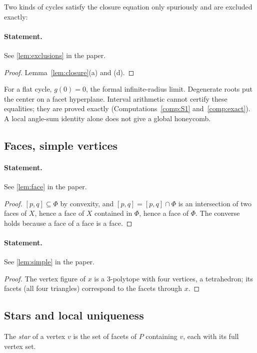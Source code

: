 \documentclass[11pt]{article}
\theoremstyle{definition}
\theoremstyle{remark}
\begin{document}
Two kinds of cycles satisfy the closure equation only
spuriously and are excluded exactly:

\paragraph{Statement.} See \ref{lem:exclusions} in the paper.

\begin{proof}
Lemma~\ref{lem:closure}(a) and (d).
\end{proof}

For a flat cycle, $g(0)=0$, the formal infinite-radius limit.
Degenerate roots put the center on a facet hyperplane. Interval
arithmetic cannot certify these equalities; they are proved exactly
(Computations~\ref{comp:S1} and~\ref{comp:exact}). A local angle-sum identity alone does not give a global honeycomb.

\subsection{Faces, simple vertices}

\paragraph{Statement.} See \ref{lem:face} in the paper.

\begin{proof}
$[p,q]\subseteq\Phi$ by convexity, and $[p,q]=[p,q]\cap\Phi$ is an
intersection of two faces of $X$, hence a face of $X$ contained in
$\Phi$, hence a face of $\Phi$. The converse holds because a face of a
face is a face.
\end{proof}

\paragraph{Statement.} See \ref{lem:simple} in the paper.

\begin{proof}
The vertex figure of $x$ is a 3-polytope with four vertices, a
tetrahedron; its facets (all four triangles) correspond to the facets
through $x$.
\end{proof}

\subsection{Stars and local uniqueness}

The \emph{star} of a vertex $v$ is the set of facets of $P$ containing
$v$, each with its full vertex set.
\end{document}
